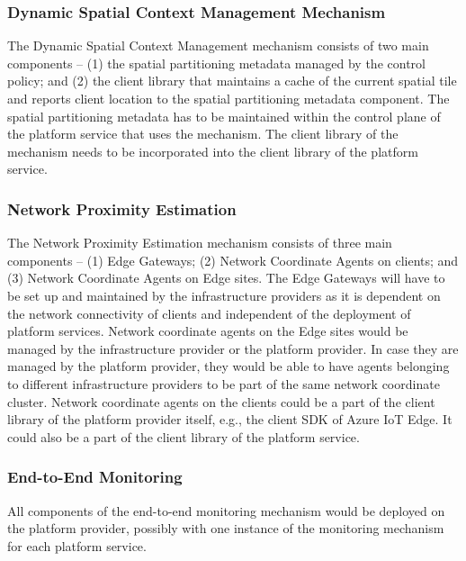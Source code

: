\subsubsection{Dynamic Spatial Context Management Mechanism}
The Dynamic Spatial Context Management mechanism consists of two main components -- (1) the spatial partitioning metadata managed by the control policy; and (2) the client library that maintains a cache of the current spatial tile and reports client location to the spatial partitioning metadata component. The spatial partitioning metadata has to be maintained within the control plane of the platform service that uses the mechanism. The client library of the mechanism needs to be incorporated into the client library of the platform service.
\subsubsection{Network Proximity Estimation}
The Network Proximity Estimation mechanism consists of three main components -- (1) Edge Gateways; (2) Network Coordinate Agents on clients; and (3) Network Coordinate Agents on Edge sites. The Edge Gateways will have to be set up and maintained by the infrastructure providers as it is dependent on the network connectivity of clients and independent of the deployment of platform services. Network coordinate agents on the Edge sites would be managed by the infrastructure provider or the platform provider. In case they are managed by the platform provider, they would be able to have agents belonging to different infrastructure providers to be part of the same network coordinate cluster. Network coordinate agents on the clients could be a part of the client library of the platform provider itself, e.g., the client SDK of Azure IoT Edge. It could also be a part of the client library of the platform service.

\subsubsection{End-to-End Monitoring}
All components of the end-to-end monitoring mechanism would be deployed on the platform provider, possibly with one instance of the monitoring mechanism for each platform service.


